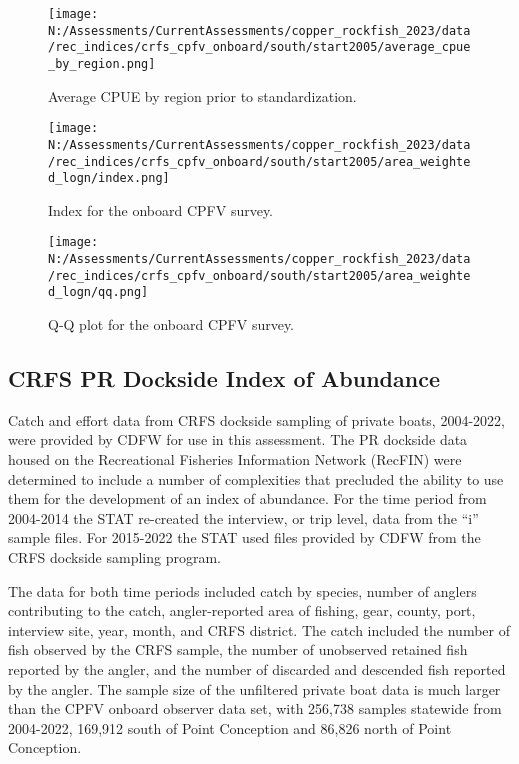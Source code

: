 \documentclass[11pt,
  english,
  letterpaper,
]{article}
\begin{document}
\newpage

\begin{figure}
\centering
\texttt{[image: N:/Assessments/CurrentAssessments/copper\_rockfish\_2023/data/rec\_indices/crfs\_cpfv\_onboard/south/start2005/average\_cpue\_by\_region.png]}
\caption{Average CPUE by region prior to standardization.\label{fig:onboard-regioncpue}}
\end{figure}

\newpage

\begin{figure}
\centering
\texttt{[image: N:/Assessments/CurrentAssessments/copper\_rockfish\_2023/data/rec\_indices/crfs\_cpfv\_onboard/south/start2005/area\_weighted\_logn/index.png]}
\caption{Index for the onboard CPFV survey.\label{fig:onboard-index}}
\end{figure}

\newpage

\begin{figure}
\centering
\texttt{[image: N:/Assessments/CurrentAssessments/copper\_rockfish\_2023/data/rec\_indices/crfs\_cpfv\_onboard/south/start2005/area\_weighted\_logn/qq.png]}
\caption{Q-Q plot for the onboard CPFV survey.\label{fig:onboard-qq}}
\end{figure}

\newpage

\hypertarget{crfs-pr-index}{%
\subsection{CRFS PR Dockside Index of Abundance}\label{crfs-pr-index}}

Catch and effort data from CRFS dockside sampling of private boats, 2004-2022, were provided by CDFW for use in this assessment. The PR dockside data housed on the Recreational Fisheries Information Network (RecFIN) were determined to include a number of complexities that precluded the ability to use them for the development of an index of abundance. For the time period from 2004-2014 the STAT re-created the interview, or trip level, data from the ``i'' sample files. For 2015-2022 the STAT used files provided by CDFW from the CRFS dockside sampling program.

The data for both time periods included catch by species, number of anglers contributing to the catch, angler-reported area of fishing, gear, county, port, interview site, year, month, and CRFS district. The catch included the number of fish observed by the CRFS sample, the number of unobserved retained fish reported by the angler, and the number of discarded and descended fish reported by the angler. The sample size of the unfiltered private boat data is much larger than the CPFV onboard observer data set, with 256,738 samples statewide from 2004-2022, 169,912 south of Point Conception and 86,826 north of Point Conception.
\end{document}
